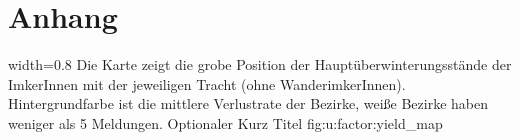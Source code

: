 \section{Anhang}











{width=0.8\textwidth} %
{Die Karte zeigt die grobe Position der Hauptüberwinterungsstände der ImkerInnen mit der jeweiligen Tracht (ohne WanderimkerInnen). Hintergrundfarbe ist die mittlere Verlustrate der Bezirke, weiße Bezirke haben weniger als 5 Meldungen.} %
{Optionaler Kurz Titel} %
{fig:u:factor:yield_map} %